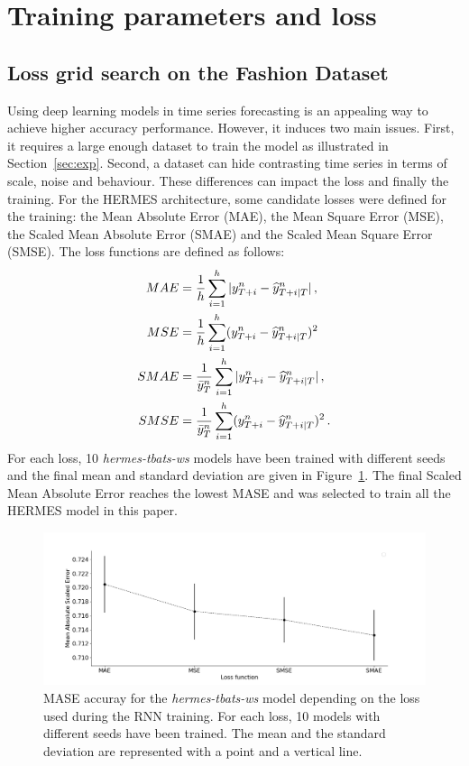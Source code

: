 \documentclass[lettersize,journal]{IEEEtran}
\newcommand{\ts}{y}
\newcommand{\tspred}{\widehat{\ts}}
\newcommand{\lag}{h}
\newcommand{\meants}{\Bar{\ts}}
\begin{document}
\section{Training parameters and loss}


\subsection{Loss grid search on the Fashion Dataset}
\label{sec:heuritechgridsearch}

Using deep learning models in time series forecasting is an appealing way to achieve higher accuracy performance. However, it induces two main issues. First, it requires a large enough dataset to train the model as illustrated in Section~\ref{sec:exp}. Second, a dataset can hide contrasting time series in terms of scale, noise and behaviour. These differences can impact the loss and finally the training. For the HERMES architecture, some candidate losses were defined for the training: the Mean Absolute Error (MAE), the Mean Square Error (MSE),  the Scaled Mean Absolute Error (SMAE) and the Scaled Mean Square Error (SMSE). The loss functions are defined as follows:
\begin{align*}
MAE &= \frac{1}{\lag}\sum_{i=1}^{\lag}|\ts^n_{T+i} - \tspred^n_{T+i|T}|\,,\\
MSE &= \frac{1}{\lag}\sum_{i=1}^{\lag}(\ts^n_{T+i} - \tspred^n_{T+i|T})^2\\
SMAE &= \frac{1}{\meants^n_T}\sum_{i=1}^{\lag}|\ts^n_{T+i} - \tspred^n_{T+i|T}|\,,\\
SMSE &= \frac{1}{\meants^n_T}\sum_{i=1}^{\lag}(\ts^n_{T+i} - \tspred^n_{T+i|T})^2\,.
\end{align*}
For each loss, 10 \textit{hermes-tbats-ws} models have been trained with different seeds and the final mean and standard deviation are given in Figure~\ref{fig:loss_function}. The final Scaled Mean Absolute Error reaches the lowest MASE and was selected to train all the HERMES model in this paper.

\begin{figure}
  \centering
    \includegraphics[width=1.\linewidth]{figure/loss_function}
  \caption{MASE accuray for the \textit{hermes-tbats-ws} model depending on the loss used during the RNN training. For each loss, 10 models with different seeds have been trained. The mean and the standard deviation are represented with a point and a vertical line.}
\label{fig:loss_function}
\end{figure}
\end{document}

